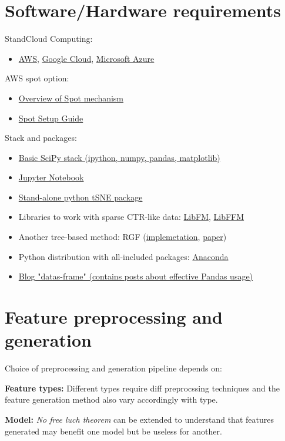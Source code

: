 \documentclass[a4paper]{article}
\begin{document}
\section{Software/Hardware requirements}
StandCloud Computing:
\begin{itemize}
\item \href{https://aws.amazon.com/}{AWS}, \href{https://cloud.google.com/}{Google Cloud}, \href{https://azure.microsoft.com/}{Microsoft Azure}
\end{itemize}
AWS spot option:
\begin{itemize}
\item \href{http://docs.aws.amazon.com/AWSEC2/latest/UserGuide/using-spot-instances.html}{Overview of Spot mechanism}
\item \href{http://www.datasciencebowl.com/aws_guide/}{Spot Setup Guide}
\end{itemize}
Stack and packages:
\begin{itemize}
\item \href{https://www.scipy.org/}{Basic SciPy stack (ipython, numpy, pandas, matplotlib)}
\item \href{http://jupyter.org/}{Jupyter Notebook}
\item \href{https://github.com/danielfrg/tsne}{Stand-alone python tSNE package}
\item Libraries to work with sparse CTR-like data: \href{http://www.libfm.org/}{LibFM}, \href{https://www.csie.ntu.edu.tw/~cjlin/libffm/}{LibFFM}
\item Another tree-based method: RGF (\href{https://github.com/baidu/fast_rgf}{implemetation}, \href{https://arxiv.org/pdf/1109.0887.pdf}{paper})
\item Python distribution with all-included packages: \href{https://www.continuum.io/what-is-anaconda}{Anaconda}
\item \href{https://tomaugspurger.github.io/}{Blog "datas-frame" (contains posts about effective Pandas usage)}
\end{itemize}

\section{Feature preprocessing and generation}
Choice of preprocessing and generation pipeline depends on:

\textbf{Feature types:} Different types require diff preprocssing techniques and the feature generation method also vary accordingly with type.

\textbf{Model:} \textit{No free luch theorem} can be extended to understand that features generated may benefit one model but be useless for another.
\end{document}
